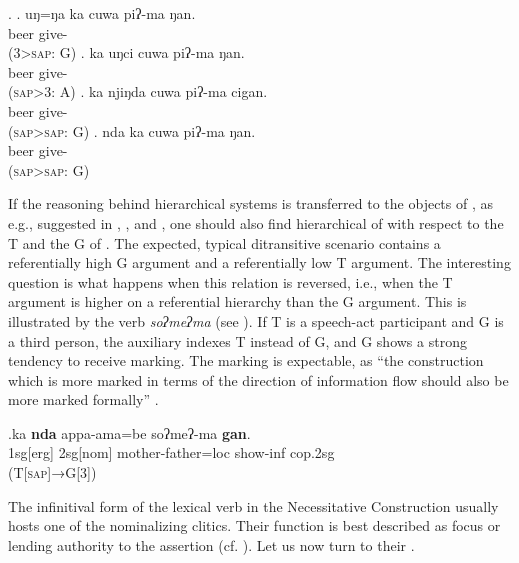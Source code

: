 \ex. \ag.  uŋ=ŋa ka cuwa piʔ-ma  ŋan.\\
    beer  give- \\
 (3>\textsc{sap}: G) 
\bg. ka uŋci cuwa  piʔ-ma ŋan.\\
  beer  give- \\
 (\textsc{sap}>3: A)
\bg. ka njiŋda cuwa piʔ-ma  cigan.\\
  beer give- \\ 
	(\textsc{sap}>\textsc{sap}: G)
\bg. nda ka cuwa piʔ-ma  ŋan.\\
  beer give- \\ 
	(\textsc{sap}>\textsc{sap}: G)


If the reasoning behind hierarchical  systems is transferred to the objects of , as e.g., suggested in \citet{Haspelmath2004Explaining}, \citet{Malchukovetal2010Ditrans-overview}, and \citet{ Siewierska2003Person}, one should also find hierarchical  of  with respect to the T and the G of . The expected, typical ditransitive scenario contains a referentially high G argument and a referentially low T argument. The interesting question is what happens when this relation is reversed, i.e., when the T argument is higher on a referential hierarchy than the G argument. This is illustrated by the verb \emph{soʔmeʔma}   (see \Next). If T is a speech-act participant  and G is a third person, the auxiliary indexes T instead of G, and G shows a strong tendency to receive   marking. The   marking is expectable, as “the construction which is more marked in terms of the direction of information flow should also be more marked formally” \citep[128]{Comrie1989Language}. 

\exg.ka \textbf{nda} appa-ama=be soʔmeʔ-ma \textbf{gan}.\\
		 {\sc 1sg[erg]}  {\sc 2sg[nom]}  mother-father{\sc =loc} show{\sc -inf} {\sc cop.2sg}\\
		 (T[\textsc{sap}]→G[3])
		


The infinitival form of the lexical verb  in the Necessitative Construction usually hosts one of the nominalizing clitics. Their  function is best described as focus or lending authority to the assertion (cf. ). Let us now turn to their . 


